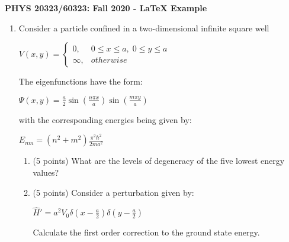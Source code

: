 \documentclass[12pt]{article}
\begin{document}
\def\pos{\medskip\quad}
\def\subpos{\smallskip \qquad}
    \begin{center}
        {\bf PHYS 20323/60323: Fall 2020 - LaTeX Example}
        \vskip0.25in
    \end{center}

    \begin{enumerate}
        \item Consider a particle confined in a two-dimensional infinite square well
        
        \begin{center}
            $
                V(x,y)= \begin{cases}
                    0, & 0\leq x\leq a,\; 0\le y\le a\\
                    \infty, & otherwise
                \end{cases}
            $
        \end{center}

        The eigenfunctions have the form:
        \begin{center} 
                $\Psi(x,y)= \frac{a}{2} \sin(\frac{n \pi x}{a}) \sin(\frac{m \pi y}{a})$
        \end{center} 

        with the corresponding energies being given by:
        \vskip0.1in
        \begin{center}
            $E_{nm}= (n^2 + m^2) \frac{\pi^2 \hbar^2}{2ma^2}$
        \end{center}

        \begin{enumerate}
            \item (5 points) What are the levels of degeneracy of the five lowest energy values?
            \item (5 points) Consider a perturbation given by: 
            \vskip0.1in
            \begin{center}
                $\hat{H}' = a^2 V_0 \delta(x-\frac{a}{2}) \delta(y-\frac{a}{2})$
            \end{center}
            Calculate the first order correction to the ground state energy.
        \end{enumerate}


\end{enumerate}
\end{document}
